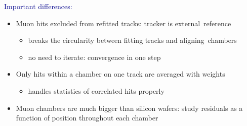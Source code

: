 \documentclass[compress]{beamer}
\begin{document}
\begin{frame}
\vspace{0.1 cm}
\textcolor{darkblue}{Important differences:}
\begin{itemize}
\item Muon hits excluded from refitted tracks: tracker is \mbox{external reference\hspace{-1 cm}}
\begin{itemize}
\item breaks the circularity between fitting tracks and \mbox{aligning chambers\hspace{-1 cm}}
\item no need to iterate: convergence in one step
\end{itemize}
\item Only hits within a chamber on one track are averaged with weights
\begin{itemize}
\item handles statistics of correlated hits properly
\end{itemize}
\item Muon chambers are much bigger than silicon wafers: study
  residuals as a function of position throughout each chamber
\end{itemize}
\end{frame}
\end{document}
